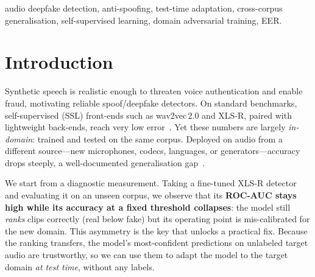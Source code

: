 \documentclass[conference]{IEEEtran}
\begin{document}
\begin{abstract}
on all four targets; a train-time domain-adversarial baseline (DANN), trained for
three\,$\times$ the compute of our method, underperforms it on three of four
targets; and a second prior domain-generalisation baseline in the
aggregation-separation family (ASDG-style, symmetric real-aggregation and
fake-separation across source domains) underperforms both our method (three of
four targets) and even plain source-only fine-tuning (three of four targets). A
proxy $\mathcal{A}$-distance analysis shows domain separability does \emph{not}
decrease after adaptation---ruling out domain-invariance as the mechanism and
supporting our ranking-calibration account instead. A per-language breakdown
over 38 held-out and in-pool MLAAD languages shows fake-clip recall is
uniform across seen and unseen languages (93.9\% vs.\ 93.3\%), indicating the
detector's cross-lingual robustness is not an artefact of language coverage
during training.
\end{abstract}

\begin{IEEEkeywords}
audio deepfake detection, anti-spoofing, test-time adaptation, cross-corpus
generalisation, self-supervised learning, domain adversarial training, EER.
\end{IEEEkeywords}

\section{Introduction}
Synthetic speech is realistic enough to threaten voice authentication and enable
fraud, motivating reliable spoof/deepfake detectors. On standard benchmarks,
self-supervised (SSL) front-ends such as wav2vec\,2.0 and XLS-R, paired with
lightweight back-ends, reach very low error~\cite{wav2vec2aug,xlsrsls,aasist}.
Yet these numbers are largely \emph{in-domain}: trained and tested on the same
corpus. Deployed on audio from a different source---new microphones, codecs,
languages, or generators---accuracy drops steeply, a well-documented
generalisation gap~\cite{asdg,crossdomain,itw}.

We start from a diagnostic measurement. Taking a fine-tuned XLS-R detector and
evaluating it on an unseen corpus, we observe that its \textbf{ROC-AUC stays
high while its accuracy at a fixed threshold collapses}: the model still
\emph{ranks} clips correctly (real below fake) but its operating point is
mis-calibrated for the new domain. This asymmetry is the key that unlocks a
practical fix. Because the ranking transfers, the model's most-confident
predictions on unlabeled target audio are trustworthy, so we can use them to
adapt the model to the target domain \emph{at test time}, without any labels.
\end{document}
